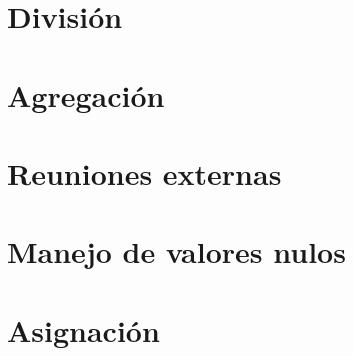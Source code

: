 \documentclass[12pt,a4paper]{report}
\begin{document}
	\section{División}
	
	\section{Agregación}
	
	\section{Reuniones externas}
	
	\section{Manejo de valores nulos}
	
	\section{Asignación}
	
		
\end{document}
